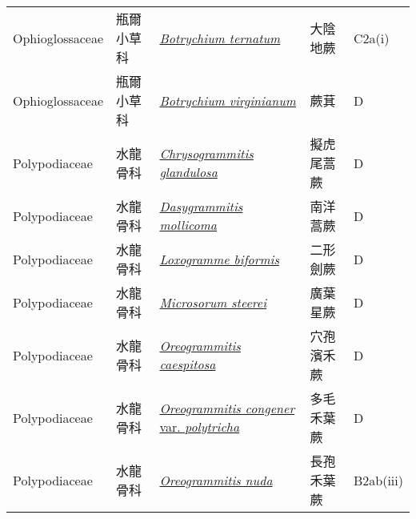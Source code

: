 {\begin{longtable}{p{2.5cm}p{2.5cm}p{4.5cm}p{2.5cm}p{3cm}}
    Ophioglossaceae & 瓶爾小草科 & \href{http://www.theplantlist.org/tpl1.1/search?q=Botrychium+ternatum}{\textit{Botrychium ternatum} } & 大陰地蕨 & C2a(i) \index{Botrychium@\textit{Botrychium}!ternatum@\textit{ternatum}}  \index{大陰地蕨} \\
    Ophioglossaceae & 瓶爾小草科 & \href{http://www.theplantlist.org/tpl1.1/search?q=Botrychium+virginianum}{\textit{Botrychium virginianum} } & 蕨萁 & D \index{Botrychium@\textit{Botrychium}!virginianum@\textit{virginianum}}  \index{蕨萁} \\
    Polypodiaceae & 水龍骨科 & \href{http://www.theplantlist.org/tpl1.1/search?q=Chrysogrammitis+glandulosa}{\textit{Chrysogrammitis glandulosa} } & 擬虎尾蒿蕨 & D \index{Chrysogrammitis@\textit{Chrysogrammitis}!glandulosa@\textit{glandulosa}}  \index{擬虎尾蒿蕨} \\
    Polypodiaceae & 水龍骨科 & \href{http://www.theplantlist.org/tpl1.1/search?q=Dasygrammitis+mollicoma}{\textit{Dasygrammitis mollicoma} } & 南洋蒿蕨 & D \index{Dasygrammitis@\textit{Dasygrammitis}!mollicoma@\textit{mollicoma}}  \index{南洋蒿蕨} \\
    Polypodiaceae & 水龍骨科 & \href{http://www.theplantlist.org/tpl1.1/search?q=Loxogramme+biformis}{\textit{Loxogramme biformis} } & 二形劍蕨 & D \index{Loxogramme@\textit{Loxogramme}!biformis@\textit{biformis}}  \index{二形劍蕨} \\
    Polypodiaceae & 水龍骨科 & \href{http://www.theplantlist.org/tpl1.1/search?q=Microsorum+steerei}{\textit{Microsorum steerei} } & 廣葉星蕨 & D \index{Microsorum@\textit{Microsorum}!steerei@\textit{steerei}}  \index{廣葉星蕨} \\
    Polypodiaceae & 水龍骨科 & \href{http://www.theplantlist.org/tpl1.1/search?q=Oreogrammitis+caespitosa}{\textit{Oreogrammitis caespitosa} } & 穴孢濱禾蕨 & D \index{Oreogrammitis@\textit{Oreogrammitis}!caespitosa@\textit{caespitosa}}  \index{穴孢濱禾蕨} \\
    Polypodiaceae & 水龍骨科 & \href{http://www.theplantlist.org/tpl1.1/search?q=Oreogrammitis+congener+var.+polytricha}{\textit{Oreogrammitis congener} var. \textit{polytricha} } & 多毛禾葉蕨 & D \index{Oreogrammitis@\textit{Oreogrammitis}!congener@\textit{congener}!var. polytricha@var. \textit{polytricha}}  \index{多毛禾葉蕨} \\
    Polypodiaceae & 水龍骨科 & \href{http://www.theplantlist.org/tpl1.1/search?q=Oreogrammitis+nuda}{\textit{Oreogrammitis nuda} } & 長孢禾葉蕨 & B2ab(iii) \index{Oreogrammitis@\textit{Oreogrammitis}!nuda@\textit{nuda}}  \index{長孢禾葉蕨} \\

\end{longtable}}
